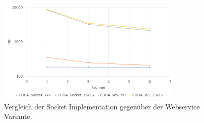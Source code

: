\documentclass[conference]{IEEEtran}
\begin{document}
\begin{figure}[!t]
	\centering
	\includegraphics[width=3.5in]{SocketvsWS_bunt_3.pdf} %
	\caption{Vergleich der Socket Implementation gegenüber der Webservice Variante.}
	\label{fig_socket_ws}
\end{figure}



%
%
\end{document}

